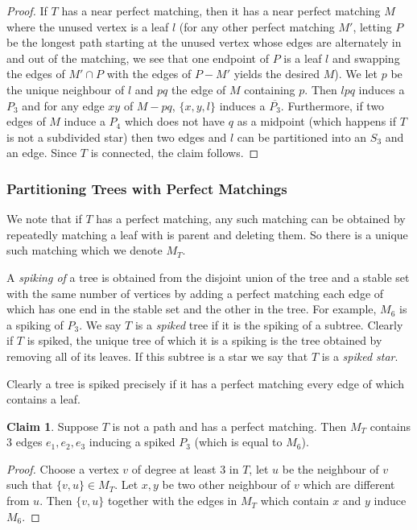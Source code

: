 \documentclass[12pt]{article}
\theoremstyle{definition}
\newtheorem{claim}[theorem]{Claim}
\begin{document}
\begin{proof}
If $T$ has a near perfect matching, then it has a near perfect matching $M$ where the unused vertex is a leaf $l$ (for any other perfect matching $M'$, letting $P$ be the 
longest path starting at the unused vertex whose edges are alternately in and out of the matching, we see that one  endpoint of $P$  is a leaf $l$ and swapping the edges of $M' \cap P$ with the edges of $P-M'$ yields the desired $M$). 
We let $p$ be the unique neighbour of $l$ and $pq$ the edge of $M$ containing $p$.
Then $lpq$ induces a $P_3$ and for any edge $xy$  of $M-pq$, $\{x,y,l\}$ induces a $\overline{P_3}$.  
Furthermore, if two edges of $M$ induce a $P_4$ which does not have $q$ as a midpoint (which happens if $T$ is not a subdivided star) then two edges and $l$ can be partitioned into an $S_3$ and an edge. Since $T$ is connected, the claim follows. 
\end{proof}

\subsubsection{Partitioning Trees with Perfect Matchings}  

We note that if $T$ has a perfect matching,
any such matching can be obtained by repeatedly matching a leaf with is parent and deleting them. 
So there is a unique such matching which we denote $M_T$.


A {\it spiking of} a  tree  is obtained from the disjoint union of the tree and a stable set with the same number of vertices 
by adding a perfect matching each edge of which has one end in the stable set and the other in the tree. For example,  $M_6$  is a spiking of  $P_3$. We say $T$ is a {\it spiked} tree  if it is the spiking of a subtree. 
Clearly if $T$ is spiked,  the unique tree of which it is a spiking  is the tree obtained by removing all of its 
leaves. If this subtree is a star we say that $T$ is a {\it spiked star}. 

Clearly a tree is spiked precisely if  it has a perfect matching   every edge of which  contains a leaf. 

\begin{claim}\label{ClaimM1M4}
Suppose $T$ is not a path and has  a perfect matching. Then $M_T$ contains $3$ edges $e_1,e_2,e_3$ inducing a spiked $P_3$ (which is equal to $M_6$). 
\end{claim}

\begin{proof}
Choose a vertex $v$ of degree at least 3 in $T$, let $u$ be the neighbour of $v$ such that $\{v,u\}\in M_T$. Let $x,y$ be two other neighbour of $v$ which are different from $u$. 
Then $\{v,u\}$ together with the edges in $M_T$ which contain  $x$ and $y$ induce $M_6$. 
\end{proof}
\end{document}
